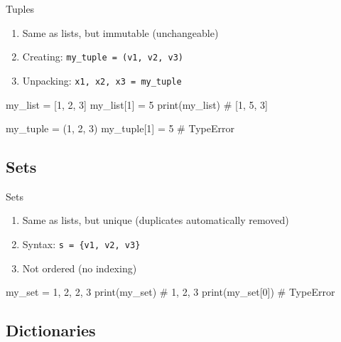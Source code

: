 \begin{frame}[fragile]{Tuples}

    \begin{enumerate}
		\item Same as lists, but immutable (unchangeable)
		\item Creating: \texttt{my\_tuple = (v1, v2, v3)}
		\item Unpacking: \texttt{x1, x2, x3 = my\_tuple}
    \end{enumerate}

	\vspace{1em}

	\begin{pythoncode}
my_list = [1, 2, 3]
my_list[1] = 5
print(my_list) # [1, 5, 3]

my_tuple = (1, 2, 3)
my_tuple[1] = 5
# TypeError
	\end{pythoncode}


\end{frame}

\subsection{Sets}

\begin{frame}[fragile]{Sets}

    \begin{enumerate}
		\item Same as lists, but unique (duplicates automatically removed)
		\item Syntax: \texttt{s = \{v1, v2, v3\}}
		\item Not ordered (no indexing)
    \end{enumerate}

	\vspace{1em}

	\begin{pythoncode}
my_set = {1, 2, 2, 3}
print(my_set) # {1, 2, 3}
print(my_set[0])
# TypeError
	\end{pythoncode}

\end{frame}

\subsection{Dictionaries}

